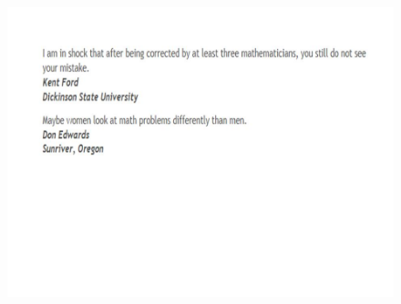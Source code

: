 \documentclass{beamer}
\begin{document}
\begin{frame}
	\begin{figure}
		\centering
		\includegraphics[width=1.18\linewidth]{MontyHall/Slide12}

	\end{figure}
	
\end{frame}
\end{document}
